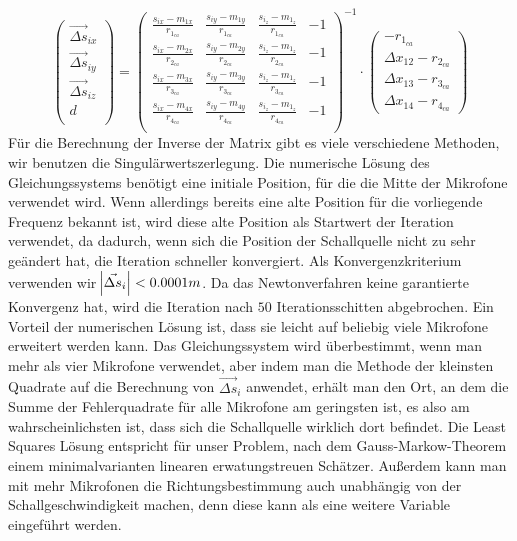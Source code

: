 $$
\begin{pmatrix}
\vec{\Delta{s}}_{ix} \\
\vec{\Delta{s}}_{iy} \\
\vec{\Delta{s}}_{iz} \\
                d \\
\end{pmatrix}
=
{\begin{pmatrix}
\frac{s_{ix} - m_{1x}}{r_{1_{ca}}} & \frac{s_{iy} - m_{1y}}{r_{1_{ca}}} & \frac{s_{i_z} - m_{1_z}}{r_{1_{ca}}} & -1 \\
\frac{s_{ix} - m_{2x}}{r_{2_{ca}}} & \frac{s_{iy} - m_{2y}}{r_{2_{ca}}} & \frac{s_{i_z} - m_{1_z}}{r_{2_{ca}}} & -1 \\
\frac{s_{ix} - m_{3x}}{r_{3_{ca}}} & \frac{s_{iy} - m_{3y}}{r_{3_{ca}}} & \frac{s_{i_z} - m_{1_z}}{r_{3_{ca}}} & -1 \\
\frac{s_{ix} - m_{4x}}{r_{4_{ca}}} & \frac{s_{iy} - m_{4y}}{r_{4_{ca}}} & \frac{s_{i_z} - m_{1_z}}{r_{4_{ca}}} & -1 \\
\end{pmatrix}}^{-1}
\cdot
\begin{pmatrix}
-r_{1_{ca}}\\
\Delta{x_{12}} - r_{2_{ca}}\\
\Delta{x_{13}} - r_{3_{ca}}\\
\Delta{x_{14}} - r_{4_{ca}}
\end{pmatrix}
$$
Für die Berechnung der Inverse der Matrix gibt es viele verschiedene Methoden, wir benutzen die Singulärwertszerlegung. Die numerische Lösung des Gleichungssystems benötigt eine initiale Position, für die die Mitte der Mikrofone verwendet wird. Wenn allerdings bereits eine alte Position für die vorliegende Frequenz bekannt ist, wird diese alte Position als Startwert der Iteration verwendet, da dadurch, wenn sich die Position der Schallquelle nicht zu sehr geändert hat, die Iteration schneller konvergiert. Als Konvergenzkriterium verwenden wir $\abs{\vec{\Delta{s}}_i} < 0.0001m$. Da das Newtonverfahren keine garantierte Konvergenz hat, wird die Iteration nach $50$ Iterationsschitten abgebrochen.
Ein Vorteil der numerischen Lösung ist, dass sie leicht auf beliebig viele Mikrofone erweitert werden kann. Das Gleichungssystem wird überbestimmt, wenn man mehr als vier Mikrofone verwendet, aber indem man die Methode der kleinsten Quadrate auf die Berechnung von $\vec{\Delta{s}}_i$ anwendet, erhält man den Ort, an dem die Summe der Fehlerquadrate für alle Mikrofone am geringsten ist, es also am wahrscheinlichsten ist, dass sich die Schallquelle wirklich dort befindet. Die Least Squares Lösung entspricht für unser Problem, nach dem Gauss-Markow-Theorem einem minimalvarianten linearen erwatungstreuen Schätzer. Außerdem kann man mit mehr Mikrofonen die Richtungsbestimmung auch unabhängig von der Schallgeschwindigkeit machen, denn diese kann als eine weitere Variable eingeführt werden.
